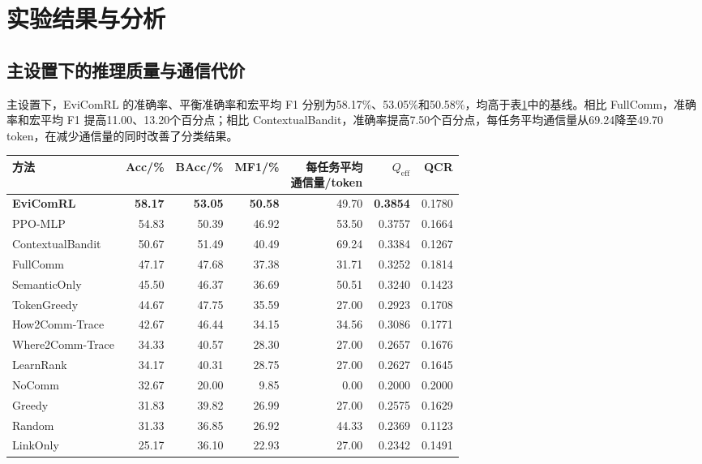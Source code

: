 \section{实验结果与分析}
\label{rq2:sec:results}
\subsection{主设置下的推理质量与通信代价}
主设置下，EviComRL 的准确率、平衡准确率和宏平均 F1 分别为58.17\%、53.05\%和50.58\%，均高于表\ref{rq2:tab:main}中的基线。相比 FullComm，准确率和宏平均 F1 提高11.00、13.20个百分点；相比 ContextualBandit，准确率提高7.50个百分点，每任务平均通信量从69.24降至49.70 token，在减少通信量的同时改善了分类结果。

\begin{table}[htbp]
\centering\small
{}
\label{rq2:tab:main}
\setlength{\tabcolsep}{3.2pt}
\begin{tabular}{lrrrrrr}
\toprule
方法 & Acc/\% & BAcc/\% & MF1/\% & \shortstack{每任务平均\\通信量/token} & $Q_{\mathrm{eff}}$ & QCR\\
\midrule
\textbf{EviComRL} & \textbf{58.17} & \textbf{53.05} & \textbf{50.58} & 49.70 & \textbf{0.3854} & 0.1780\\
PPO-MLP & 54.83 & 50.39 & 46.92 & 53.50 & 0.3757 & 0.1664\\
ContextualBandit & 50.67 & 51.49 & 40.49 & 69.24 & 0.3384 & 0.1267\\
FullComm & 47.17 & 47.68 & 37.38 & 31.71 & 0.3252 & 0.1814\\
SemanticOnly & 45.50 & 46.37 & 36.69 & 50.51 & 0.3240 & 0.1423\\
TokenGreedy & 44.67 & 47.75 & 35.59 & 27.00 & 0.2923 & 0.1708\\
How2Comm-Trace & 42.67 & 46.44 & 34.15 & 34.56 & 0.3086 & 0.1771\\
Where2Comm-Trace & 34.33 & 40.57 & 28.30 & 27.00 & 0.2657 & 0.1676\\
LearnRank & 34.17 & 40.31 & 28.75 & 27.00 & 0.2627 & 0.1645\\
NoComm & 32.67 & 20.00 & 9.85 & 0.00 & 0.2000 & 0.2000\\
Greedy & 31.83 & 39.82 & 26.99 & 27.00 & 0.2575 & 0.1629\\
Random & 31.33 & 36.85 & 26.92 & 44.33 & 0.2369 & 0.1123\\
LinkOnly & 25.17 & 36.10 & 22.93 & 27.00 & 0.2342 & 0.1491\\
\bottomrule
\end{tabular}
\end{table}

